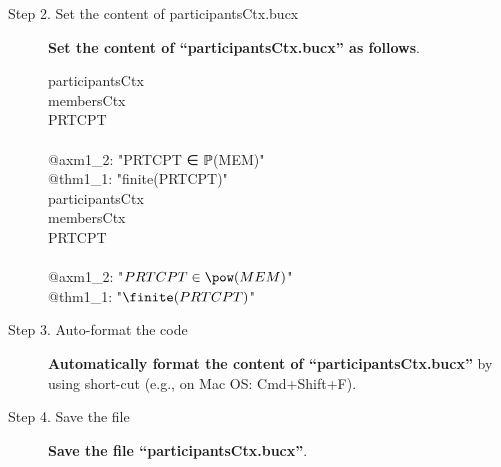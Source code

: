 \begin{description}
\item[Step 2. Set the content of participantsCtx.bucx] \textbf{Set the content of ``participantsCtx.bucx'' as follows}.
  \begin{center}
    \begin{Bcode}
      \ifplastex
      \Bcontext{} participantsCtx\\
      \Bextends{} membersCtx\\
      \Bconstants{} PRTCPT\\
      \Baxioms\\
      @axm1_2: "PRTCPT ∈ ℙ(MEM)"\\
      @thm1_1: "finite(PRTCPT)" \Btheorem\\
      \Bend
      \else
      \Bcontext{} participantsCtx\\
      \Bextends{} membersCtx\\
      \Bconstants{} PRTCPT\\
      \Baxioms\\
      \Btab @axm1_2: "\(PRTCPT \in \pow(MEM)\)"\\
      \Btab @thm1_1: "\(\finite(PRTCPT)\)" \Btheorem\\
      \Bend
      \fi
    \end{Bcode}
  \end{center}

\item[Step 3. Auto-format the code] \textbf{Automatically format the content of ``participantsCtx.bucx''} by using short-cut (e.g., on Mac OS: Cmd+Shift+F).

\item[Step 4. Save the file] \textbf{Save the file ``participantsCtx.bucx''}.
\end{description}


